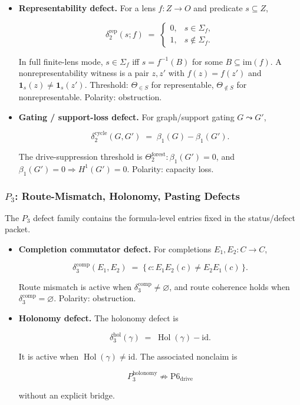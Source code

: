 \documentclass[11pt]{article}
\theoremstyle{definition}
\begin{document}
\begin{itemize}
\item
  \textbf{Representability defect.} For a lens \(f:Z\to O\) and predicate \(s\subseteq Z\),

  \[
  \delta_2^{\mathrm{rep}}(s;f)\;=\;
  \begin{cases}
  0, & s\in\Sigma_f,\\
  1, & s\notin\Sigma_f.
  \end{cases}
  \]

  In full finite-lens mode, \(s\in\Sigma_f\) iff \(s=f^{-1}(B)\) for some \(B\subseteq\mathrm{im}(f)\). A nonrepresentability witness is a pair \(z,z'\) with \(f(z)=f(z')\) and \(\mathbf 1_s(z)\neq\mathbf 1_s(z')\). Threshold: \(\Theta_{\in S}\) for representable, \(\Theta_{\notin S}\) for nonrepresentable. Polarity: obstruction.
\item
  \textbf{Gating / support-loss defect.} For graph/support gating \(G\leadsto G'\),

  \[
  \delta_2^{\mathrm{cycle}}(G,G')\;=\;\beta_1(G)-\beta_1(G').
  \]

  The drive-suppression threshold is \(\Theta_2^{\mathrm{forest}}:\beta_1(G')=0\), and \(\beta_1(G')=0\Rightarrow H^1(G')=0\). Polarity: capacity loss.
\end{itemize}

\subsubsection{\texorpdfstring{\(P_3\): Route-Mismatch, Holonomy, Pasting Defects}{P\_3: Route-Mismatch, Holonomy, Pasting Defects}}

The \(P_3\) defect family contains the formula-level entries fixed in the status/defect packet.

\begin{itemize}
\item
  \textbf{Completion commutator defect.} For completions \(E_1,E_2:C\to C\),

  \[
  \delta_3^{\mathrm{comp}}(E_1,E_2)\;=\;\{\,c:E_1E_2(c)\neq E_2E_1(c)\,\}.
  \]

  Route mismatch is active when \(\delta_3^{\mathrm{comp}}\neq\varnothing\), and route coherence holds when \(\delta_3^{\mathrm{comp}}=\varnothing\). Polarity: obstruction.
\item
  \textbf{Holonomy defect.} The holonomy defect is

  \[
  \delta_3^{\mathrm{hol}}(\gamma)\;=\;\operatorname{Hol}(\gamma)-\mathrm{id}.
  \]

  It is active when \(\operatorname{Hol}(\gamma)\neq\mathrm{id}\). The associated nonclaim is

  \[
  P_3^{\mathrm{holonomy}}\not\Rightarrow \mathrm{P6}_{\mathrm{drive}}
  \]

  without an explicit bridge.
\end{itemize}
\end{document}
